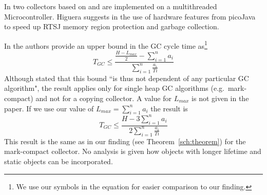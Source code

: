 In \cite{gc:pfeffer04} two collectors based on \cite{gc:dijkstra78}
and \cite{gc:baker92} are implemented on a multithreaded
Microcontroller.  Higuera suggests in \cite{gc:higu02} the use of
hardware features from picoJava to speed up RTSJ memory region
protection and garbage collection.

In \cite{780745} the authors provide an upper bound in the GC cycle
time as\footnote{We use our symbols in the equation for easier
comparison to our finding.}
%
\begin{equation}
\nonumber
    T_{GC} \le \frac{\frac{H-L_{max}}{2}-\sum_{i=1}^{n} a_i}{\sum_{i=1}^{n} \frac{a_i}{Ti}}
\end{equation}
%
Although stated that this bound ``is thus not dependent of any
particular GC algorithm", the result applies only for single heap GC
algorithms (e.g.\ mark-compact) and not for a copying collector. A
value for $L_{max}$ is not given in the paper. If we use our value
of $L_{max} =\sum_{i=1}^{n} a_i$ the result is
%
\begin{equation}
\nonumber
    T_{GC} \le \frac{H-3\sum_{i=1}^{n} a_i}{2\sum_{i=1}^{n} \frac{a_i}{Ti}}
\end{equation}
%
This result is the same as in our finding (see
Theorem~\ref{sch:theorem}) for the mark-compact collector. No
analysis is given how objects with longer lifetime and static
objects can be incorporated.
